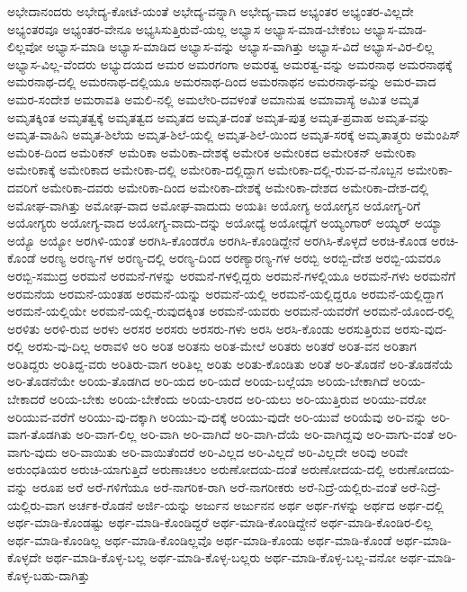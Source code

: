{ಅಭೇದಾನಂದರು
ಅಭೇದ್ಯ-ಕೋಟೆ-ಯಂತೆ
ಅಭೇದ್ಯ-ವನ್ನಾಗಿ
ಅಭೇದ್ಯ-ವಾದ
ಅಭ್ಯಂತರ
ಅಭ್ಯಂತರ-ವಿಲ್ಲದೇ
ಅಭ್ಯಂತರವೂ
ಅಭ್ಯಂತರ-ವೇನೂ
ಅಭ್ಯಸಿಸುತ್ತಿರುವೆ-ಯಲ್ಲ
ಅಭ್ಯಾಸ
ಅಭ್ಯಾಸ-ಮಾಡ-ಬೇಕೆಂಬ
ಅಭ್ಯಾಸ-ಮಾಡ-ಲಿಲ್ಲವೋ
ಅಭ್ಯಾಸ-ಮಾಡಿ
ಅಭ್ಯಾಸ-ಮಾಡಿದ
ಅಭ್ಯಾಸ-ವನ್ನು
ಅಭ್ಯಾಸ-ವಾಗಿತ್ತು
ಅಭ್ಯಾಸ-ವಿದೆ
ಅಭ್ಯಾಸ-ವಿರ-ಲಿಲ್ಲ
ಅಭ್ಯಾಸ-ವಿಲ್ಲ-ವೆಂದರು
ಅಭ್ಯುದಯದ
ಅಮರ
ಅಮರಗಂಗಾ
ಅಮರತ್ವ
ಅಮರತ್ವ-ವನ್ನು
ಅಮರನಾಥ
ಅಮರನಾಥಕ್ಕೆ
ಅಮರನಾಥ-ದಲ್ಲಿ
ಅಮರನಾಥ-ದಲ್ಲಿಯೂ
ಅಮರನಾಥ-ದಿಂದ
ಅಮರನಾಥನ
ಅಮರನಾಥ-ವನ್ನು
ಅಮರ-ವಾದ
ಅಮರ-ಸಂದೇಶ
ಅಮರಾವತಿ
ಅಮಲಿ-ನಲ್ಲಿ
ಅಮಲೇರಿ-ದವಳಂತೆ
ಅಮಾನುಷ
ಅಮಾವಾಸ್ಯೆ
ಅಮಿತ
ಅಮೃತ
ಅಮೃತಕ್ಕಿಂತ
ಅಮೃತತ್ವಕ್ಕೆ
ಅಮೃತತ್ವದ
ಅಮೃತದ
ಅಮೃತ-ದಂತೆ
ಅಮೃತ-ಪುತ್ರ
ಅಮೃತ-ಪ್ರವಾಹ
ಅಮೃತ-ವನ್ನು
ಅಮೃತ-ವಾಹಿನಿ
ಅಮೃತ-ಶಿಲೆಯ
ಅಮೃತ-ಶಿಲೆ-ಯಲ್ಲಿ
ಅಮೃತ-ಶಿಲೆ-ಯಿಂದ
ಅಮೃತ-ಸರಕ್ಕೆ
ಅಮೃತಾತ್ಮರು
ಅಮೆಂಪಿಸ್
ಅಮೆರಿಕ-ದಿಂದ
ಅಮೆರಿಕನ್
ಅಮೆರಿಕಾ
ಅಮೆರಿಕಾ-ದೇಶಕ್ಕೆ
ಅಮೇರಿಕ
ಅಮೇರಿಕದ
ಅಮೇರಿಕನ್
ಅಮೇರಿಕಾ
ಅಮೇರಿಕಾಕ್ಕೆ
ಅಮೇರಿಕಾದ
ಅಮೇರಿಕಾ-ದಲ್ಲಿ
ಅಮೇರಿಕಾ-ದಲ್ಲಿದ್ದಾಗ
ಅಮೇರಿಕಾ-ದಲ್ಲಿ-ರುವ-ವ-ನೊಬ್ಬನ
ಅಮೇರಿಕಾ-ದವರಿಗೆ
ಅಮೇರಿಕಾ-ದವರು
ಅಮೇರಿಕಾ-ದಿಂದ
ಅಮೇರಿಕಾ-ದೇಶಕ್ಕೆ
ಅಮೇರಿಕಾ-ದೇಶದ
ಅಮೇರಿಕಾ-ದೇಶ-ದಲ್ಲಿ
ಅಮೋಘ-ವಾಗಿತ್ತು
ಅಮೋಘ-ವಾದ
ಅಮೋಘ-ವಾದುದು
ಅಯತಿಃ
ಅಯೋಗ್ಯ
ಅಯೋಗ್ಯನ
ಅಯೋಗ್ಯ-ರಿಗೆ
ಅಯೋಗ್ಯರು
ಅಯೋಗ್ಯ-ವಾದ
ಅಯೋಗ್ಯ-ವಾದು-ದನ್ನು
ಅಯೋಧ್ಯೆ
ಅಯೋಧ್ಯೆಗೆ
ಅಯ್ಯಂಗಾರ್
ಅಯ್ಯರ್
ಅಯ್ಯಾ
ಅಯ್ಯೊ
ಅಯ್ಯೋ
ಅರಗಿಳಿ-ಯಂತೆ
ಅರಗಿಸಿ-ಕೊಂಡರೊ
ಅರಗಿಸಿ-ಕೊಂಡಿದ್ದೇನೆ
ಅರಗಿಸಿ-ಕೊಳ್ಳದೆ
ಅರಚಿ-ಕೊಂಡ
ಅರಚಿ-ಕೊಂಡೆ
ಅರಣ್ಯ
ಅರಣ್ಯ-ಗಳ
ಅರಣ್ಯ-ದಲ್ಲಿ
ಅರಣ್ಯ-ದಿಂದ
ಅರಣ್ಯಾರಣ್ಯ-ಗಳ
ಅರಬ್ಬಿ
ಅರಬ್ಬಿ-ದೇಶ
ಅರಬ್ಬಿ-ಯವರೂ
ಅರಬ್ಬಿ-ಸಮುದ್ರ
ಅರಮನೆ
ಅರಮನೆ-ಗಳನ್ನು
ಅರಮನೆ-ಗಳಲ್ಲಿದ್ದರು
ಅರಮನೆ-ಗಳಲ್ಲಿಯೂ
ಅರಮನೆ-ಗಳು
ಅರಮನೆಗೆ
ಅರಮನೆಯ
ಅರಮನೆ-ಯಂತಹ
ಅರಮನೆ-ಯನ್ನು
ಅರಮನೆ-ಯಲ್ಲಿ
ಅರಮನೆ-ಯಲ್ಲಿದ್ದರೂ
ಅರಮನೆ-ಯಲ್ಲಿದ್ದಾಗ
ಅರಮನೆ-ಯಲ್ಲಿಯೇ
ಅರಮನೆ-ಯಲ್ಲಿ-ರುವುದಕ್ಕಿಂತ
ಅರಮನೆ-ಯವರು
ಅರಮನೆ-ಯವರೆಗೆ
ಅರಮನೆ-ಯೊಂದ-ರಲ್ಲಿ
ಅರಳಿತು
ಅರಳಿ-ರುವ
ಅರಳು
ಅರಸರ
ಅರಸರು
ಅರಸರು-ಗಳು
ಅರಸಿ
ಅರಸಿ-ಕೊಂಡು
ಅರಸುತ್ತಿರುವ
ಅರಸು-ವುದ-ರಲ್ಲಿ
ಅರಸು-ವು-ದಿಲ್ಲ
ಅರಾವಳಿ
ಅರಿ
ಅರಿತ
ಅರಿತನು
ಅರಿತ-ಮೇಲೆ
ಅರಿತರು
ಅರಿತರೆ
ಅರಿತ-ವನ
ಅರಿತಾಗ
ಅರಿತಿದ್ದರು
ಅರಿತಿದ್ದ-ವರು
ಅರಿತಿರು-ವಾಗ
ಅರಿತಿಲ್ಲ
ಅರಿತು
ಅರಿತು-ಕೊಂಡಿತು
ಅರಿತೆ
ಅರಿ-ತೊಡನೆ
ಅರಿ-ತೊಡನೆಯೆ
ಅರಿ-ತೊಡನೆಯೇ
ಅರಿಯ-ತೊಡಗಿದ
ಅರಿ-ಯದ
ಅರಿ-ಯದೆ
ಅರಿಯ-ಬಲ್ಲೆಯಾ
ಅರಿಯ-ಬೇಕಾಗಿದೆ
ಅರಿಯ-ಬೇಕಾದರೆ
ಅರಿಯ-ಬೇಕು
ಅರಿಯ-ಬೇಕೆಂದು
ಅರಿಯ-ಲಾರದ
ಅರಿ-ಯಲು
ಅರಿ-ಯುತ್ತಿರುವ
ಅರಿಯು-ವರೋ
ಅರಿಯುವ-ವರೆಗೆ
ಅರಿಯು-ವು-ದಕ್ಕಾಗಿ
ಅರಿಯು-ವು-ದಕ್ಕೆ
ಅರಿಯು-ವುದೇ
ಅರಿ-ಯುವೆ
ಅರಿಯೆವು
ಅರಿ-ವನ್ನು
ಅರಿ-ವಾಗ-ತೊಡಗಿತು
ಅರಿ-ವಾಗ-ಲಿಲ್ಲ
ಅರಿ-ವಾಗಿ
ಅರಿ-ವಾಗಿದೆ
ಅರಿ-ವಾಗಿ-ದೆಯೆ
ಅರಿ-ವಾಗಿದ್ದವು
ಅರಿ-ವಾಗು-ವಂತೆ
ಅರಿ-ವಾಗು-ವುದು
ಅರಿ-ವಾಯಿತು
ಅರಿ-ವಾಯಿತೆಂದರೆ
ಅರಿ-ವಿಲ್ಲದ
ಅರಿ-ವಿಲ್ಲದೆ
ಅರಿ-ವಿಲ್ಲದೇ
ಅರಿವು
ಅರಿವೇ
ಅರುಂಧತಿಯರ
ಅರುಚಿ-ಯಾಗುತ್ತಿದೆ
ಅರುಣಾಚಲಂ
ಅರುಣೋದಯ-ದಂತೆ
ಅರುಣೋದಯ-ದಲ್ಲಿ
ಅರುಣೋದಯ-ವನ್ನು
ಅರೂಪ
ಅರೆ
ಅರೆ-ಗಳಿಗೆಯೂ
ಅರೆ-ನಾಗರಿಕ-ರಾಗಿ
ಅರೆ-ನಾಗರೀಕರು
ಅರೆ-ನಿದ್ರೆ-ಯಲ್ಲಿರು-ವಂತೆ
ಅರೆ-ನಿದ್ರೆ-ಯಲ್ಲಿರು-ವಾಗ
ಅರ್ಚಕ-ರೊಡನೆ
ಅರ್ಜಿ-ಯನ್ನು
ಅರ್ಜುನ
ಅರ್ಜುನನ
ಅರ್ಥ
ಅರ್ಥ-ಗಳನ್ನು
ಅರ್ಥದ
ಅರ್ಥ-ದಲ್ಲಿ
ಅರ್ಥ-ಮಾಡಿ-ಕೊಂಡಷ್ಟು
ಅರ್ಥ-ಮಾಡಿ-ಕೊಂಡಿದ್ದರೆ
ಅರ್ಥ-ಮಾಡಿ-ಕೊಂಡಿದ್ದೇನೆ
ಅರ್ಥ-ಮಾಡಿ-ಕೊಂಡಿರ-ಲಿಲ್ಲ
ಅರ್ಥ-ಮಾಡಿ-ಕೊಂಡಿಲ್ಲ
ಅರ್ಥ-ಮಾಡಿ-ಕೊಂಡಿಲ್ಲವೊ
ಅರ್ಥ-ಮಾಡಿ-ಕೊಂಡು
ಅರ್ಥ-ಮಾಡಿ-ಕೊಂಡೆ
ಅರ್ಥ-ಮಾಡಿ-ಕೊಳ್ಳದೇ
ಅರ್ಥ-ಮಾಡಿ-ಕೊಳ್ಳ-ಬಲ್ಲ
ಅರ್ಥ-ಮಾಡಿ-ಕೊಳ್ಳ-ಬಲ್ಲರು
ಅರ್ಥ-ಮಾಡಿ-ಕೊಳ್ಳ-ಬಲ್ಲ-ವನೋ
ಅರ್ಥ-ಮಾಡಿ-ಕೊಳ್ಳ-ಬಹು-ದಾಗಿತ್ತು
}
